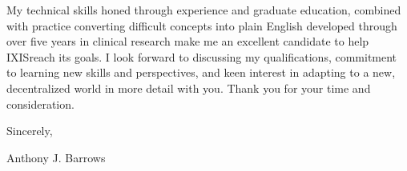 \documentclass[letterpaper,11pt]{article}
\newcommand{\company}{IXIS}
\newcommand{\actionStatment}{
	My technical skills honed through experience and graduate education, combined with practice converting difficult concepts into plain English developed through over five years in clinical research make me an excellent candidate to help \company \space reach its goals. 
}
\begin{document}
	\actionStatment I look forward to discussing my qualifications, commitment to learning new skills and perspectives, and keen interest in adapting to a new, decentralized world in more detail with you. Thank you for your time and consideration.
	
	\vspace{5mm}
	
	Sincerely,
	\vspace{3mm}
	
	Anthony J. Barrows
\end{document}
